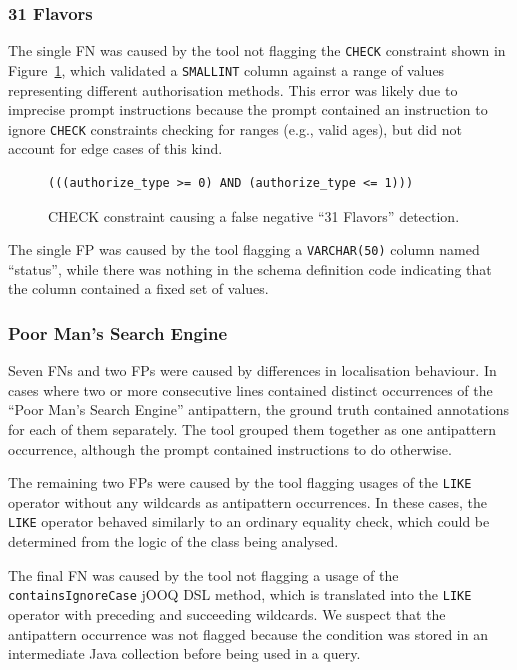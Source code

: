 \subsubsection*{31 Flavors}
The single FN was caused by the tool not flagging the \texttt{CHECK} constraint shown in Figure~\ref{fig:checkConstraint}, which validated a \texttt{SMALLINT} column against a range of values representing different authorisation methods. This error was likely due to imprecise prompt instructions because the prompt contained an instruction to ignore \texttt{CHECK} constraints checking for ranges (e.g., valid ages), but did not account for edge cases of this kind.

\begin{figure}[h]
    \begin{lstlisting}[frame=none, basicstyle=\small, breaklines=true, breakatwhitespace=false, breakindent=0pt]
(((authorize_type >= 0) AND (authorize_type <= 1)))
    \end{lstlisting}
    \caption{CHECK constraint causing a false negative “31 Flavors” detection.}
    \label{fig:checkConstraint}
\end{figure}

The single FP was caused by the tool flagging a \texttt{VARCHAR(50)} column named “status”, while there was nothing in the schema definition code indicating that the column contained a fixed set of values.

\subsubsection*{Poor Man's Search Engine}
Seven FNs and two FPs were caused by differences in localisation behaviour. In cases where two or more consecutive lines contained distinct occurrences of the “Poor Man's Search Engine” antipattern, the ground truth contained annotations for each of them separately. The tool grouped them together as one antipattern occurrence, although the prompt contained instructions to do otherwise.

The remaining two FPs were caused by the tool flagging usages of the \texttt{LIKE} operator without any wildcards as antipattern occurrences. In these cases, the \texttt{LIKE} operator behaved similarly to an ordinary equality check, which could be determined from the logic of the class being analysed.

The final FN was caused by the tool not flagging a usage of the \texttt{containsIgnoreCase} jOOQ DSL method, which is translated into the \texttt{LIKE} operator with preceding and succeeding wildcards. We suspect that the antipattern occurrence was not flagged because the condition was stored in an intermediate Java collection before being used in a query.

